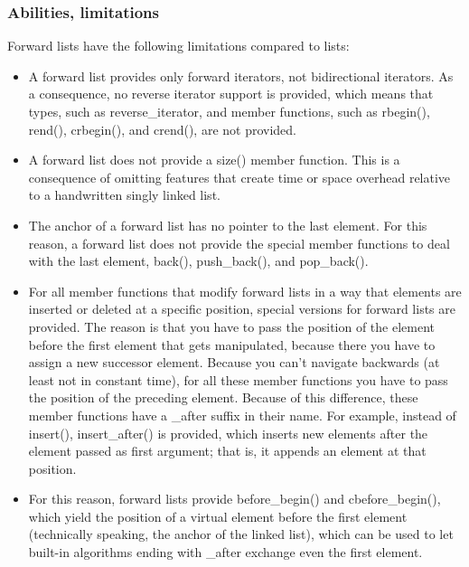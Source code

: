 \documentclass{report}
\begin{document}
   \bigbreak \noindent 
   \subsubsection{Abilities, limitations}
   \bigbreak \noindent \bigbreak \noindent 
   Forward lists have the following limitations compared to lists:
   \begin{itemize}
       \item A forward list provides only forward iterators, not bidirectional iterators. As a consequence, no reverse iterator support is provided, which means that types, such as reverse\_iterator, and member functions, such as rbegin(), rend(), crbegin(), and crend(), are not provided.
       \item A forward list does not provide a size() member function. This is a consequence of omitting features that create time or space overhead relative to a handwritten singly linked list.
       \item The anchor of a forward list has no pointer to the last element. For this reason, a forward list does not provide the special member functions to deal with the last element, back(), push\_back(), and pop\_back().
       \item For all member functions that modify forward lists in a way that elements are inserted or deleted at a specific position, special versions for forward lists are provided. The reason is that you have to pass the position of the element before the first element that gets manipulated, because there you have to assign a new successor element. Because you can’t navigate backwards (at least not in constant time), for all these member functions you have to pass the position of the preceding element. Because of this difference, these member functions have a \_after suffix in their name. For example, instead of insert(), insert\_after() is provided, which inserts new elements after the element passed as first argument; that is, it appends an element at that position.
       \item For this reason, forward lists provide before\_begin() and cbefore\_begin(), which yield the position of a virtual element before the first element (technically speaking, the anchor of the linked list), which can be used to let built-in algorithms ending with \_after exchange even the first element.
   \end{itemize}

   \bigbreak \noindent 
\end{document}
